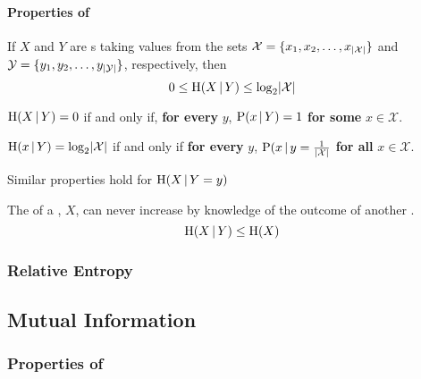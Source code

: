 \paragraph{Properties of }\label{par:Conditional_Entropy_Properties}
\begin{propertylist}
\item If $X$ and $Y$ are s taking values from the sets $\mathcal{X} = \lbrace x_{1}, x_{2}, \ldots, x_{\lvert \mathcal{X} \rvert} \rbrace$ and $\mathcal{Y} = \lbrace y_{1}, y_{2}, \ldots, y_{\lvert \mathcal{Y} \rvert} \rbrace$, respectively, then\label{prop:Conditional_Entropy_Bounds}
  \begin{equation}\label{eq:Conditional_Entropy_Bounds}
    0 \leq \operatorname{\operatorname{H}}(X \operatorname{\vert} Y) \leq \log_{2} \lvert \mathcal{X} \rvert
  \end{equation}
\item $\operatorname{\operatorname{H}}(X \operatorname{\vert} Y) = 0$ if and only if, \textbf{for every} $y$, $\operatorname{\operatorname{P}}(x \operatorname{\vert} Y) = 1$ \textbf{for some} $x \in \mathcal{X}$.\label{prop:Conditional_Entropy_Min_Bound}
\item $\operatorname{\operatorname{H}}(x \operatorname{\vert} Y) = \log_{2} \lvert \mathcal{X} \rvert$ if and only if \textbf{for every} $y$, $\operatorname{\operatorname{P}}(x \operatorname{\vert} y = \frac{1}{\lvert \mathcal{X} \rvert}$ \textbf{for all} $x \in \mathcal{X}$.\label{prop:Conditional_Entropy_Max_Bound}
\item Similar properties hold for $\operatorname{\operatorname{H}}(X \operatorname{\vert} Y=y)$
\item The  of a , $X$, can never increase by knowledge of the outcome of another .\label{prop:Conditional_Entropy_Bounded_By_Entropy}
  \begin{equation}\label{eq:Conditional_Entropy_Bounded_By_Entropy}
    \operatorname{\operatorname{H}}(X \operatorname{\vert} Y) \leq \operatorname{\operatorname{H}}(X)
  \end{equation}
\end{propertylist}

\subsubsection{Relative Entropy}\label{subsubsec:Relative_Entropy}

\subsection{Mutual Information}\label{subsec:Mutual_Information}
\subsubsection{Properties of }\label{subsubsec:Mutual_Information_Properties}

